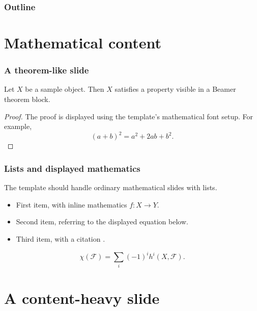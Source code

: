 

\showtodostrue

\frame{\titlepage}

\begin{frame}
    \frametitle{Outline}
    \tableofcontents
\end{frame}

\section{Mathematical content}

\begin{frame}
    \frametitle{A theorem-like slide}

    \begin{theorem}
        Let \(X\) be a sample object. Then \(X\) satisfies a property visible in a
        Beamer theorem block.
    \end{theorem}

    \begin{proof}
        The proof is displayed using the template's mathematical font setup. For
        example,
        \[
            (a+b)^2 = a^2 + 2ab + b^2.
        \]
    \end{proof}

\end{frame}

\begin{frame}
    \frametitle{Lists and displayed mathematics}

    The template should handle ordinary mathematical slides with lists.

    \begin{itemize}
        \item First item, with inline mathematics \(f \colon X \to Y\).
        \item Second item, referring to the displayed equation below.
        \item Third item, with a citation \cite{har77}.
    \end{itemize}

    \[
        \chi(\mathscr{F}) =
        \sum_i (-1)^i h^i(X,\mathscr{F}).
    \]
\end{frame}

\section{A content-heavy slide}

